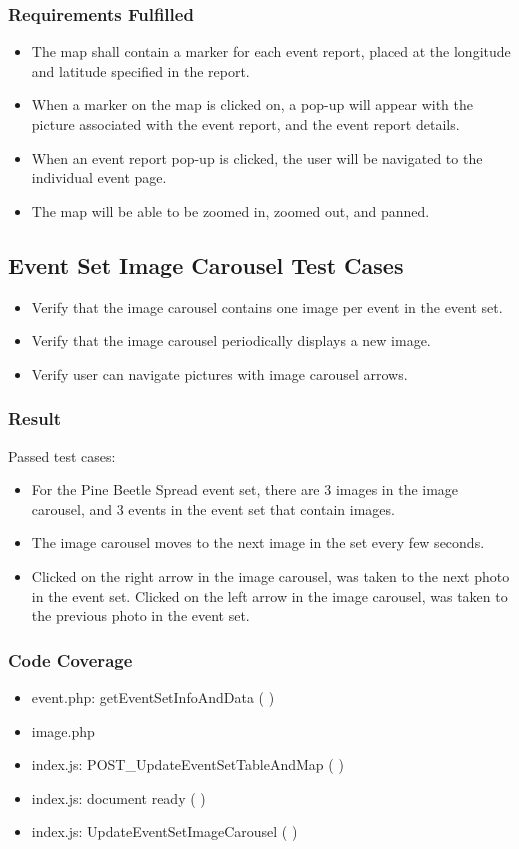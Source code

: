 \subsubsection{Requirements Fulfilled}
\begin{itemize}
\item The map shall contain a marker for each event report, placed at the longitude and latitude specified in the report.
\item When a marker on the map is clicked on, a pop-up will appear with the picture associated with the event report, and the event report details. 
\item When an event report pop-up is clicked, the user will be navigated to the individual event page.
\item The map will be able to be zoomed in, zoomed out, and panned.
\end{itemize}

\subsection{Event Set Image Carousel Test Cases}
\begin{itemize}
\item Verify that the image carousel contains one image per event in the event set.
\item Verify that the image carousel periodically displays a new image.
\item Verify user can navigate pictures with image carousel arrows.
\end{itemize}
\subsubsection{Result}
Passed test cases:
\begin{itemize}
\item For the Pine Beetle Spread event set, there are 3 images in the image carousel, and 3 events in the event set that contain images. 
\item The image carousel moves to the next image in the set every few seconds.
\item Clicked on the right arrow in the image carousel, was taken to the next photo in the event set. Clicked on the left arrow in the image carousel, was taken to the previous photo in the event set.
\end{itemize}
\subsubsection{Code Coverage}
\begin{itemize}
\item event.php: getEventSetInfoAndData ( )
\item image.php
\item index.js: POST\_UpdateEventSetTableAndMap ( )
\item index.js: document ready ( )
\item index.js: UpdateEventSetImageCarousel ( )
\end{itemize}
